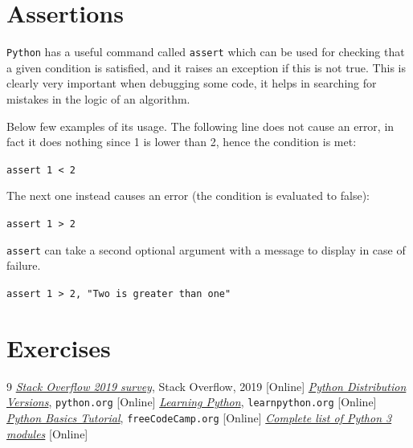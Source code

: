 \section{Assertions}
\texttt{Python} has a useful command called \texttt{assert} which can be used for checking that a given condition is satisfied, and it raises an exception if this is not true. This is clearly very important when debugging some code, it helps in searching for mistakes in the logic of an algorithm.

Below few examples of its usage. The following line does not cause an error, in fact it does nothing since 1 is lower than 2, hence the condition is met:

\lstinline[language=iPython]|assert 1 < 2|

\noindent
The next one instead causes an error (the condition is evaluated to false): 

\lstinline[language=iPython]|assert 1 > 2|

\noindent
\texttt{assert} can take a second optional argument with a message to display in case of failure.

\lstinline[language=iPython]|assert 1 > 2, "Two is greater than one"|

\section*{Exercises}


\begin{thebibliography}{9}
 \href{https://insights.stackoverflow.com/survey/2019}{\emph{Stack Overflow 2019 survey}}, Stack Overflow, 2019 [Online]
 \href{https://www.python.org/downloads/}{\emph{Python Distribution Versions}}, \texttt{python.org} [Online]
 \href{https://www.learnpython.org/it/}{\emph{Learning Python}}, \texttt{learnpython.org} [Online]
 \href{https://www.youtube.com/watch?v=8DvywoWv6fI}{\emph{Python Basics Tutorial}}, \texttt{freeCodeCamp.org} [Online]
 \href{https://docs.python.org/3/py-modindex.html}{\emph{Complete list of Python 3 modules}} [Online]
\end{thebibliography}
